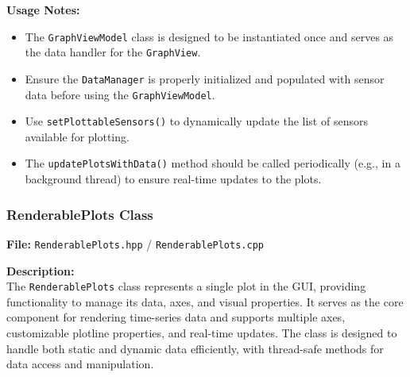 \documentclass{article}
\begin{document}
\vspace{5pt}
\noindent
\textbf{Usage Notes:}
\begin{itemize}
    \item The \texttt{GraphViewModel} class is designed to be instantiated once and serves as the data handler for the \texttt{GraphView}.

    \item Ensure the \texttt{DataManager} is properly initialized and populated with sensor data before using the \texttt{GraphViewModel}.

    \item Use \texttt{setPlottableSensors()} to dynamically update the list of sensors available for plotting.

    \item The \texttt{updatePlotsWithData()} method should be called periodically (e.g., in a background thread) to ensure real-time updates to the plots.
\end{itemize}


\vspace{10pt}
\subsubsection{RenderablePlots Class}
\textbf{File:} \texttt{RenderablePlots.hpp} / \texttt{RenderablePlots.cpp} 

\vspace{5pt}
\noindent
\textbf{Description:}
\\
\noindent
The \texttt{RenderablePlots} class represents a single plot in the GUI, providing functionality to manage its data, axes, and visual properties. It serves as the core component for rendering time-series data and supports multiple axes, customizable plotline properties, and real-time updates. The class is designed to handle both static and dynamic data efficiently, with thread-safe methods for data access and manipulation.
\end{document}

